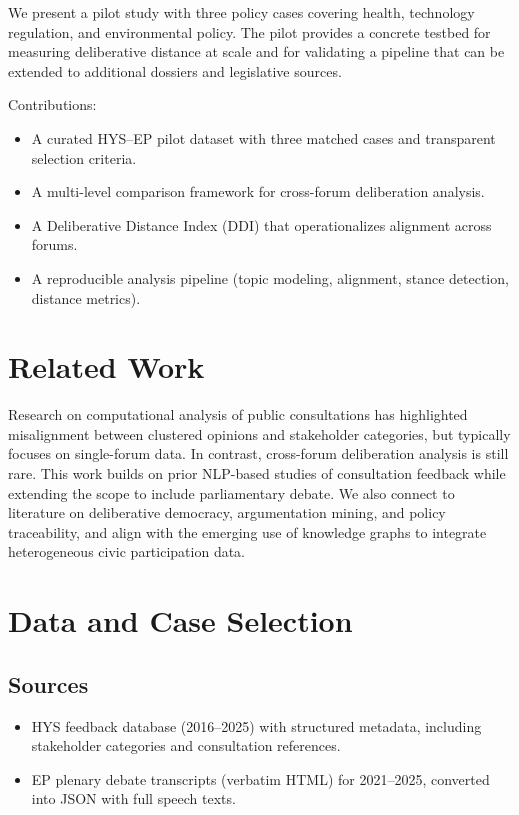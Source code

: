\documentclass[11pt,a4paper]{article}
\begin{document}
We present a pilot study with three policy cases covering health, technology regulation, and environmental policy. The pilot provides a concrete testbed for measuring deliberative distance at scale and for validating a pipeline that can be extended to additional dossiers and legislative sources.

Contributions:
\begin{itemize}
  \item A curated HYS--EP pilot dataset with three matched cases and transparent selection criteria.
  \item A multi-level comparison framework for cross-forum deliberation analysis.
  \item A Deliberative Distance Index (DDI) that operationalizes alignment across forums.
  \item A reproducible analysis pipeline (topic modeling, alignment, stance detection, distance metrics).
\end{itemize}

\section{Related Work}
Research on computational analysis of public consultations has highlighted misalignment between clustered opinions and stakeholder categories, but typically focuses on single-forum data. In contrast, cross-forum deliberation analysis is still rare. This work builds on prior NLP-based studies of consultation feedback while extending the scope to include parliamentary debate. We also connect to literature on deliberative democracy, argumentation mining, and policy traceability, and align with the emerging use of knowledge graphs to integrate heterogeneous civic participation data.

\section{Data and Case Selection}
\subsection{Sources}
\begin{itemize}
  \item HYS feedback database (2016--2025) with structured metadata, including stakeholder categories and consultation references.
  \item EP plenary debate transcripts (verbatim HTML) for 2021--2025, converted into JSON with full speech texts.
\end{itemize}
\end{document}
